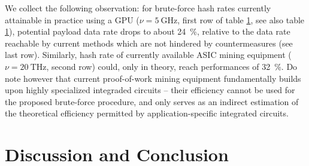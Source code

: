 \documentclass[10pt,a4paper,twocolumn]{article}
\begin{document}
We collect the following observation:
for brute-force hash rates currently attainable in practice using a GPU ($\nu = \SI{5}{\giga\hertz}$, first row of table \ref{}, see also table \ref{}), potential payload data rate drops to about \SI{24}{\percent}, relative to the data rate reachable by current methods which are not hindered by countermeasures (see last row).
Similarly, hash rate of currently available ASIC mining equipment ($\nu = \SI{20}{\tera\hertz}$, second row) could, only in theory, reach performances of \SI{32}{\percent}.
Do note however that current proof-of-work mining equipment fundamentally builds upon highly specialized integraded circuits – 
their efficiency cannot be used for the proposed brute-force procedure, and only serves as an indirect estimation of the theoretical efficiency permitted by application-specific integrated circuits.


\section{Discussion and Conclusion}

\end{document}
